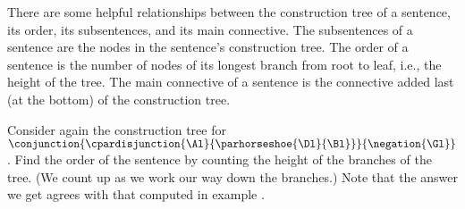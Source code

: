 \noindent{}There are some helpful relationships between the construction tree of a sentence,  its order, its subsentences, and its main connective. 
The subsentences of a sentence are the nodes in the sentence's construction tree.
The order of a sentence is the number of nodes of its longest branch from root to leaf, i.e., the height of the tree. 
The main connective of a sentence is the connective added last (at the bottom) of the construction tree. 
\begin{majorILnc}{}
Consider again the construction tree for $\conjunction{\cpardisjunction{\Al}{\parhorseshoe{\Dl}{\Bl}}}{\negation{\Gl}}$. 
Find the order of the sentence by counting the height of the branches of the tree. 
(We count up as we work our way down the branches.)
Note that the answer we get agrees with that computed in example .
\begin{center}
\end{center}
\end{majorILnc}

